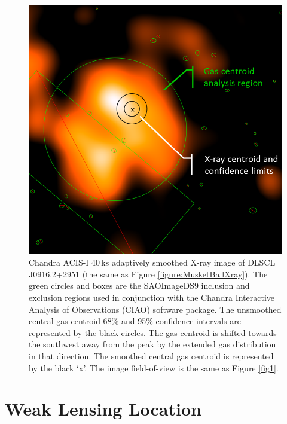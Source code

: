 \begin{figure}
\centering
\includegraphics[width=5in]{Chapter4/XrayCentRegions_reformat.png}
\caption[Musket Ball Cluster X-ray map with estimated centroid.]{
Chandra ACIS-I 40\,ks adaptively smoothed X-ray image of DLSCL J0916.2+2951 (the same as Figure \ref{figure:MusketBallXray}).
The green circles and boxes are the SAOImageDS9 inclusion and exclusion regions used in conjunction with the Chandra Interactive Analysis of Observations (CIAO) software package.
The unsmoothed central gas centroid 68\% and 95\% confidence intervals are represented by the black circles.
The gas centroid is shifted towards the southwest away from the peak by the extended gas distribution in that direction.
The smoothed central gas centroid is represented by the black `x'.
The image field-of-view is the same as Figure \ref{fig1}.
}
\label{figure:XrayCentroid}
\end{figure}


\section{Weak Lensing Location}\label{section:WLLocation}

